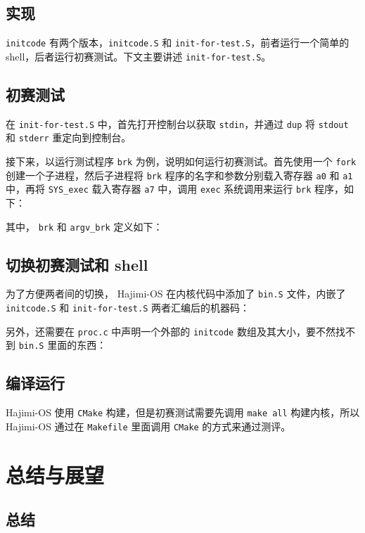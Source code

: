 \documentclass[UTF8]{article}
\begin{document}
\subsection{\textbf{实现}}
\texttt{initcode} 有两个版本，\texttt{initcode.S} 和 \texttt{init-for-test.S}，前者运行一个简单的 shell，后者运行初赛测试。下文主要讲述 \texttt{init-for-test.S}。

\subsection{\textbf{初赛测试}}
在 \texttt{init-for-test.S} 中，首先打开控制台以获取 \texttt{stdin}，并通过 \texttt{dup} 将 \texttt{stdout} 和 \texttt{stderr} 重定向到控制台。


接下来，以运行测试程序 \texttt{brk} 为例，说明如何运行初赛测试。首先使用一个 \texttt{fork} 创建一个子进程，然后子进程将 \texttt{brk} 程序的名字和参数分别载入寄存器 \texttt{a0} 和 \texttt{a1} 中，再将 \texttt{SYS\_exec} 载入寄存器 \texttt{a7} 中，调用 \texttt{exec} 系统调用来运行 \texttt{brk} 程序，如下：

其中， \texttt{brk} 和 \texttt{argv\_brk} 定义如下：


\subsection{\textbf{切换初赛测试和 shell}}
为了方便两者间的切换， Hajimi-OS 在内核代码中添加了 \texttt{bin.S} 文件，内嵌了 \texttt{initcode.S} 和 \texttt{init-for-test.S} 两者汇编后的机器码：


另外，还需要在 \texttt{proc.c} 中声明一个外部的 \texttt{initcode} 数组及其大小，要不然找不到 \texttt{bin.S} 里面的东西：


\subsection{\textbf{编译运行}}
Hajimi-OS 使用 \texttt{CMake} 构建，但是初赛测试需要先调用 \texttt{make all} 构建内核，所以 Hajimi-OS 通过在 \texttt{Makefile} 里面调用 \texttt{CMake} 的方式来通过测评。

\section{总结与展望}
\subsection{总结}
\end{document}
